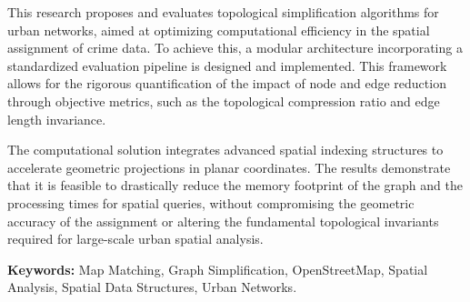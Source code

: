 This research proposes and evaluates topological simplification algorithms for urban networks, aimed at optimizing computational efficiency in the spatial assignment of crime data. To achieve this, a modular architecture incorporating a standardized evaluation pipeline is designed and implemented. This framework allows for the rigorous quantification of the impact of node and edge reduction through objective metrics, such as the topological compression ratio and edge length invariance.

The computational solution integrates advanced spatial indexing structures to accelerate geometric projections in planar coordinates. The results demonstrate that it is feasible to drastically reduce the memory footprint of the graph and the processing times for spatial queries, without compromising the geometric accuracy of the assignment or altering the fundamental topological invariants required for large-scale urban spatial analysis.

\vspace{1cm}
\noindent \textbf{Keywords:} Map Matching, Graph Simplification, OpenStreetMap, Spatial Analysis, Spatial Data Structures, Urban Networks.